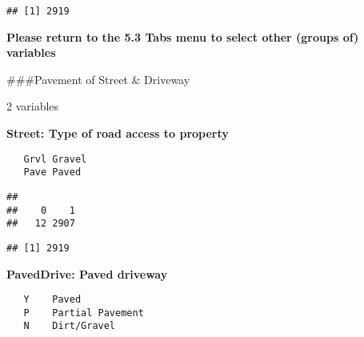 \documentclass[]{article}
\newenvironment{Shaded}{\begin{snugshade}}{\end{snugshade}}
\newcommand{\CommentTok}[1]{\textcolor[rgb]{0.56,0.35,0.01}{\textit{#1}}}
\newcommand{\DecValTok}[1]{\textcolor[rgb]{0.00,0.00,0.81}{#1}}
\newcommand{\KeywordTok}[1]{\textcolor[rgb]{0.13,0.29,0.53}{\textbf{#1}}}
\newcommand{\NormalTok}[1]{#1}
\newcommand{\OperatorTok}[1]{\textcolor[rgb]{0.81,0.36,0.00}{\textbf{#1}}}
\newcommand{\StringTok}[1]{\textcolor[rgb]{0.31,0.60,0.02}{#1}}
\begin{document}
\begin{Shaded}
\end{Shaded}

\begin{verbatim}
## [1] 2919
\end{verbatim}

\textbf{Please return to the 5.3 Tabs menu to select other (groups of)
variables}

\#\#\#Pavement of Street \& Driveway

2 variables

\textbf{Street: Type of road access to property}

\begin{verbatim}
   Grvl Gravel  
   Pave Paved
\end{verbatim}

\begin{Shaded}
\end{Shaded}

\begin{verbatim}
## 
##    0    1 
##   12 2907
\end{verbatim}

\begin{Shaded}
\end{Shaded}

\begin{verbatim}
## [1] 2919
\end{verbatim}

\textbf{PavedDrive: Paved driveway}

\begin{verbatim}
   Y    Paved 
   P    Partial Pavement
   N    Dirt/Gravel
\end{verbatim}
\end{document}

